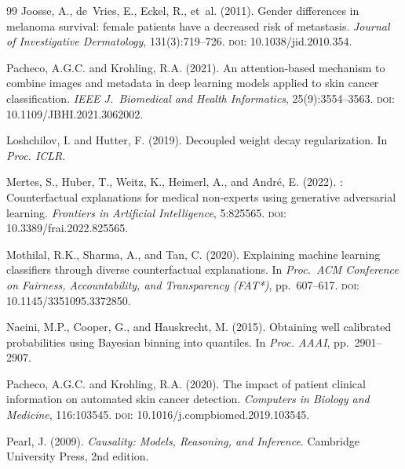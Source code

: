 \documentclass[12pt, a4paper]{article}
\begin{document}
\begin{thebibliography}{99}
Joosse, A., de~Vries, E., Eckel, R., et~al. (2011).
\newblock Gender differences in melanoma survival: female patients have a decreased risk of metastasis.
\newblock \emph{Journal of Investigative Dermatology}, 131(3):719--726.
\newblock \textsc{doi}: 10.1038/jid.2010.354.

Pacheco, A.G.C. and Krohling, R.A. (2021).
\newblock An attention-based mechanism to combine images and metadata in deep learning models applied to skin cancer classification.
\newblock \emph{IEEE J.\ Biomedical and Health Informatics}, 25(9):3554--3563.
\newblock \textsc{doi}: 10.1109/JBHI.2021.3062002.

Loshchilov, I. and Hutter, F. (2019).
\newblock Decoupled weight decay regularization.
\newblock In \emph{Proc. ICLR}.

Mertes, S., Huber, T., Weitz, K., Heimerl, A., and Andr\'{e}, E. (2022).
: Counterfactual explanations for medical non-experts using generative adversarial learning.
\newblock \emph{Frontiers in Artificial Intelligence}, 5:825565.
\newblock \textsc{doi}: 10.3389/frai.2022.825565.

Mothilal, R.K., Sharma, A., and Tan, C. (2020).
\newblock Explaining machine learning classifiers through diverse counterfactual explanations.
\newblock In \emph{Proc.\ ACM Conference on Fairness, Accountability, and Transparency (FAT*)}, pp.\ 607--617.
\newblock \textsc{doi}: 10.1145/3351095.3372850.

Naeini, M.P., Cooper, G., and Hauskrecht, M. (2015).
\newblock Obtaining well calibrated probabilities using {Bayesian} binning into quantiles.
\newblock In \emph{Proc. AAAI}, pp.\ 2901--2907.

Pacheco, A.G.C. and Krohling, R.A. (2020).
\newblock The impact of patient clinical information on automated skin cancer detection.
\newblock \emph{Computers in Biology and Medicine}, 116:103545.
\newblock \textsc{doi}: 10.1016/j.compbiomed.2019.103545.

Pearl, J. (2009).
\newblock \emph{Causality: Models, Reasoning, and Inference}.
\newblock Cambridge University Press, 2nd edition.


\end{thebibliography}
\end{document}
